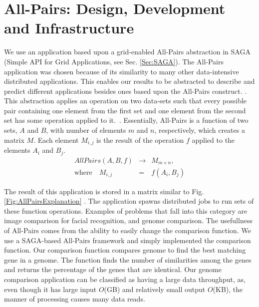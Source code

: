 \documentclass{rspublic}
\newcommand{\micnote}[1]{ {\textcolor{blue} { ***Michael: #1 }}}
\newcommand{\betynote}[1]{ {\textcolor{orange} { ***Bety: #1 }}}
\newcommand{\jhanote}[1]{} \newcommand{\micnote}[1]{}\newcommand{\betynote}[1]{} \newcommand{\fixme}[1]{}
\begin{document}




\section{All-Pairs: Design, Development and Infrastructure} We use an
application based upon a grid-enabled All-Pairs abstraction in SAGA
(Simple API for Grid Applications, see Sec. \ref{Sec:SAGA}). The
All-Pairs application was chosen because of its similarity to many
other data-intensive distributed applications. This enables our
results to be abstracted to describe and predict different
applications besides ones based upon the All-Pairs
construct. \jhanote{a bit more describing the fact that this is a
 pattern and how benefits will be general}. This abstraction applies
an operation on two data-sets such that every possible pair containing
one element from the first set and one element from the second set has
some operation applied to it.~\citep{Interop, AllPairs}. Essentially,
All-Pairs is a function of two sets, $A$ and $B$, with number of
elements $m$ and $n$, respectively, which creates a matrix $M$. Each
element $M_{i,j}$ is the result of the operation $f$ applied to the
elements $A_i$ and $B_j$.
\begin{eqnarray}
 AllPairs(A, B, f) & \rightarrow & M_{m \times n}, \\
\mbox{where} \quad M_{i,j} & = & f(A_{i},B_{j})
 \end{eqnarray}

 The result of this application is stored in a matrix similar to Fig.
 \ref{Fig:AllPairsExplanation} . The application spawns distributed
 jobs to run sets of these function operations. Examples of problems
 that fall into this category are image comparison for facial
 recognition, and genome comparison.  The usefullness of All-Pairs
 comes from the ability to easily change the comparison function.  We
 use a SAGA-based All-Pairs framework and simply implemented the
 comparison function.  Our comparison function compares genome to find
 the best matching gene in a genome.  The function finds the number of
 similarities among the genes and returns the percentage of the genes
 that are identical. Our genome comparison application can be
 classified as having a large data throughput, as, even though it has
 large input $O$(GB) and relatively small output $O$(KB), the manner
 of processing causes many data reads.
\end{document}
